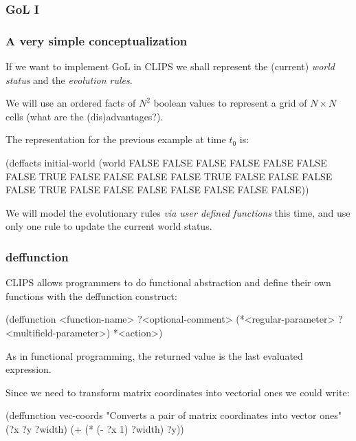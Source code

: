 \documentclass[xcolor={usenames,dvipsnames,svgnames}, compress]{beamer}
\begin{document}
\begin{frame}[fragile]
  \frametitle{GoL I}
  \frametitle{A very simple conceptualization}
  If we want to implement GoL in CLIPS we shall represent the
  (current) \emph{world status} and the \emph{evolution rules}.\par\bigskip
  We will use an ordered facts of $N^2$ boolean values to represent a
  grid of $N\times N$ cells (what are the (dis)advantages?).\par
  The representation for the previous example at time $t_0$ is:
  \begin{clips-code}[numbers=none]
    (deffacts initial-world
        (world FALSE FALSE FALSE FALSE FALSE
               FALSE FALSE TRUE FALSE FALSE
               FALSE FALSE TRUE FALSE FALSE
               FALSE FALSE TRUE FALSE FALSE
               FALSE FALSE FALSE FALSE FALSE))
  \end{clips-code}

  We will model the evolutionary rules \emph{via user defined functions} this time, and use only
  one rule to update the current world status.           
\end{frame}



\begin{frame}[fragile]
  \frametitle{deffunction}
  CLIPS allows programmers to do functional abstraction and define
  their own functions with the \textsf{deffunction} construct:
  \begin{clips-code}[numbers=none]
    (deffunction <function-name>
        ?<optional-comment>
        (*<regular-parameter> ?<multifield-parameter>)
        *<action>)
  \end{clips-code}

  As in functional programming, the returned value is the last
  evaluated expression.\par
  Since we need to transform matrix coordinates
  into vectorial ones we could write:
  \begin{clips-code}[numbers=none]
    (deffunction vec-coords
        "Converts a pair of matrix coordinates into vector ones"
        (?x ?y ?width)
        (+ (* (- ?x 1) ?width) ?y))
  \end{clips-code}
\end{frame}
\end{document}
